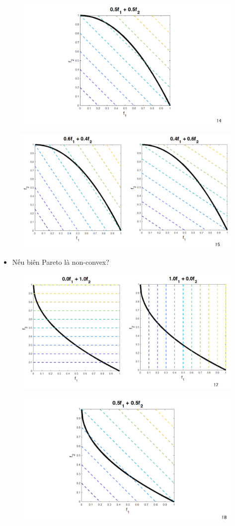 \documentclass{book}
\begin{document}
\begin{figure}[H]
    \centering
    \includegraphics[width=0.75\linewidth]{images/GA-7-8_14.png}
\end{figure}

\begin{figure}[H]
    \centering
    \includegraphics[width=0.75\linewidth]{images/GA-7-8_15.png}
\end{figure}

\begin{itemize}
    \item Nếu biên Pareto là non-convex?
\end{itemize}

\begin{figure}[H]
    \centering
    \includegraphics[width=0.75\linewidth]{images/GA-7-8_17.png}
\end{figure}

\begin{figure}[H]
    \centering
    \includegraphics[width=0.75\linewidth]{images/GA-7-8_18.png}
\end{figure}
\end{document}
